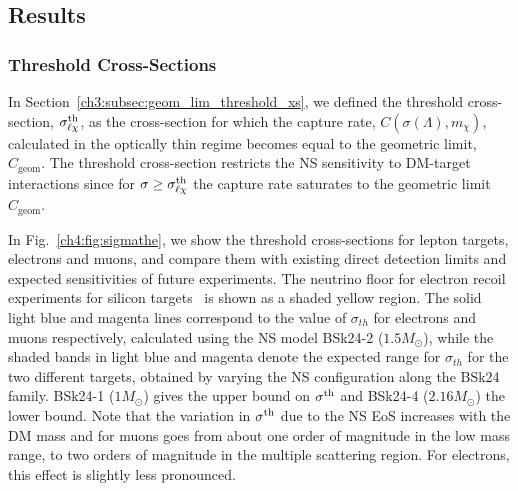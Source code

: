\subsection{Results}
\label{ch4:subsec:results_NS}

\subsubsection{Threshold Cross-Sections}
\label{ch4:subsubsec:thxs}

In Section~\ref{ch3:subsec:geom_lim_threshold_xs}, we defined the threshold cross-section, $\sigma^{\rm th}_{\ell\chi}$, as the cross-section for which the capture rate, $C(\sigma(\Lambda),m_\chi)$, calculated in the optically thin regime becomes equal to the geometric limit, $C_\mathrm{geom}$. 
The threshold cross-section restricts the NS sensitivity to DM-target interactions since for $\sigma\ge\sigma^{\rm th}_{\ell\chi}$ the capture rate saturates to the geometric limit $C_\mathrm{geom}$. 



In Fig.~\ref{ch4:fig:sigmathe}, we show the threshold cross-sections for lepton targets, electrons and muons, and compare them with existing direct detection limits and expected sensitivities of future experiments. The neutrino floor for electron recoil experiments for silicon targets~\cite{Essig:2018tss_Solarneutrinossignal} is shown as a shaded yellow region.
The solid light blue and magenta lines correspond to the value of $\sigma_{th}$ for electrons and muons respectively, calculated using the NS model BSk24-2  ($1.5 M_\odot$), while the shaded bands in light blue and magenta denote the expected range for $\sigma_{th}$ for the two different targets, obtained by varying the NS configuration along the BSk24 family. 
 BSk24-1 ($1M_\odot$) gives the upper bound on $\sigma^{\rm th}$ and BSk24-4 ($2.16 M_\odot$) the lower bound. 
Note that the variation in $\sigma^{\rm th}$ due to the NS EoS increases with the DM mass and for muons goes from about one order of magnitude in the low mass range, to two orders of magnitude in the multiple scattering region. For electrons, this effect is slightly less pronounced.


